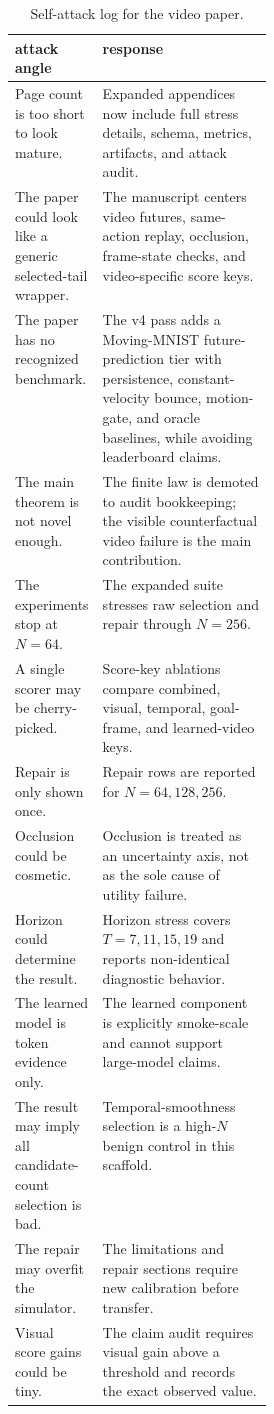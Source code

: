 \documentclass{article}
\begin{document}
\begin{table}[tbp]
  \centering
  \small
  \caption{Self-attack log for the video paper.}
  \label{tab:self-attack-log}
  \begin{tabularx}{\linewidth}{@{}p{0.30\linewidth}X@{}}
    \toprule
    attack angle & response \\
    \midrule
    Page count is too short to look mature. & Expanded appendices now include full stress details, schema, metrics, artifacts, and attack audit. \\
    The paper could look like a generic selected-tail wrapper. & The manuscript centers video futures, same-action replay, occlusion, frame-state checks, and video-specific score keys. \\
    The paper has no recognized benchmark. & The v4 pass adds a Moving-MNIST future-prediction tier with persistence, constant-velocity bounce, motion-gate, and oracle baselines, while avoiding leaderboard claims. \\
    The main theorem is not novel enough. & The finite law is demoted to audit bookkeeping; the visible counterfactual video failure is the main contribution. \\
    The experiments stop at \(N=64\). & The expanded suite stresses raw selection and repair through \(N=256\). \\
    A single scorer may be cherry-picked. & Score-key ablations compare combined, visual, temporal, goal-frame, and learned-video keys. \\
    Repair is only shown once. & Repair rows are reported for \(N=64,128,256\). \\
    Occlusion could be cosmetic. & Occlusion is treated as an uncertainty axis, not as the sole cause of utility failure. \\
    Horizon could determine the result. & Horizon stress covers \(T=7,11,15,19\) and reports non-identical diagnostic behavior. \\
    The learned model is token evidence only. & The learned component is explicitly smoke-scale and cannot support large-model claims. \\
    The result may imply all candidate-count selection is bad. & Temporal-smoothness selection is a high-\(N\) benign control in this scaffold. \\
    The repair may overfit the simulator. & The limitations and repair sections require new calibration before transfer. \\
    Visual score gains could be tiny. & The claim audit requires visual gain above a threshold and records the exact observed value. \\

\end{tabularx}
\end{table}
\end{document}
